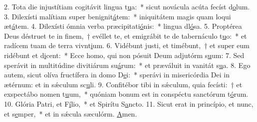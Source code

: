 2. Tota die injustítiam cogitávit lingua t\uline{u}a:~* sicut novácula acúta fecíst d\uline{o}lum.
3. Dilexísti malítiam super benignit\uline{á}tem:~* iniquitátem magis quam loqui æt\uline{á}tem.
4. Dilexísti ómnia verba præcipitati\uline{ó}nis:~* lingua dl\uline{ó}sa.
5. Proptérea Deus déstruet te in finem,~† evéllet te, et emigrábit te de tabernáculo t\uline{u}o:~* et radícem tuam de terra vivnt\uline{i}um.
6. Vidébunt justi, et timébunt,~† et super eum ridébunt et d\uline{i}cent:~* Ecce homo, qui non pósuit Deum adjutórm s\uline{u}um:
7. Sed sperávit in multitúdine divitiárum su\uline{á}rum:~* et præváluit in vanitát s\uline{u}a.
8. Ego autem, sicut olíva fructífera in domo D\uline{e}i:~* sperávi in misericórdia Dei in ætérnum: et in sǽculum sc\uline{u}li.
9. Confitébor tibi in sǽculum, quia fecísti:~† et exspectábo nomen t\uline{u}um,~* quóniam bonum est in conspéctu sanctórum t\uline{ó}rum.
10. Glória Patri, et F\uline{í}lio,~* et Spirítu S\uline{a}ncto.
11. Sicut erat in princípio, et nunc, et s\uline{e}mper,~* et in sǽcula sæculórm. \uline{A}men.
